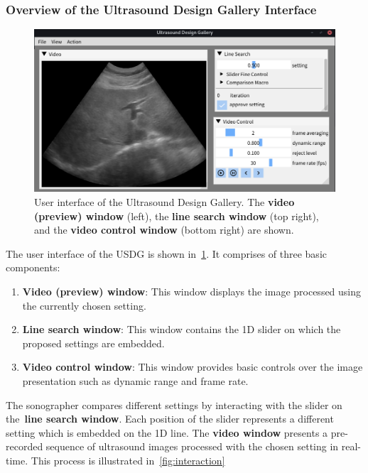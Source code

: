 \subsubsection{Overview of the Ultrasound Design Gallery Interface}
%
\begin{figure}[t]
  \vspace{-0.2in}
  \centering
  \includegraphics[scale=0.30]{figures/ui.png}
  \caption{User interface of the Ultrasound Design Gallery. The \textbf{video (preview) window} (left), the \textbf{line search window} (top right), and the \textbf{video control window} (bottom right) are shown.}\label{fig:ui}
  \vspace{-0.1in}
\end{figure}
%
The user interface of the USDG is shown in~\cref{fig:ui}.
It comprises of three basic components:
\begin{enumerate}
  \item[\ding{228}] \textbf{Video (preview) window}: This window displays the image processed using the currently chosen setting.
  \item[\ding{228}] \textbf{Line search window}: This window contains the 1D slider on which the proposed settings are embedded.
  \item[\ding{228}] \textbf{Video control window}: This window provides basic controls over the image presentation such as dynamic range and frame rate.
\end{enumerate}
The sonographer compares different settings by interacting with the slider on the~\textbf{line search window}.
Each position of the slider represents a different setting which is embedded on the 1D line.
The \textbf{video window} presents a pre-recorded sequence of ultrasound images processed with the chosen setting in real-time.
This process is illustrated in~\cref{fig:interaction}

